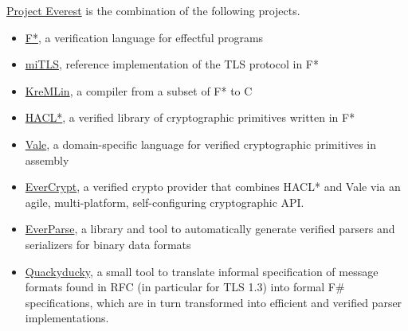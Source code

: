 \documentclass[12pt,twoside]{article}
\begin{document}
\noindent{}\href{https://project-everest.github.io}{Project Everest} is the combination of the following projects.%

\begin{itemize}[noitemsep,topsep=\mdcompacttopsep]%

\item{}\href{https://fstar-lang.org}{F*}, a verification language for effectful programs%

\item{}\href{https://mitls.org/}{miTLS}, reference implementation of the TLS protocol in F*%

\item{}\href{https://github.com/FStarLang/kremlin}{KreMLin}, a compiler from a subset of F* to C%

\item{}\href{https://github.com/mitls/hacl-star}{HACL*}, a verified library of cryptographic primitives written in F*%

\item{}\href{https://github.com/project-everest/vale}{Vale}, a domain-specific language for verified cryptographic primitives in assembly%

\item{}\href{https://github.com/project-everest/hacl-star/blob/fstar-master/README.EverCrypt.md}{EverCrypt}, a verified crypto provider that combines HACL* and Vale via an agile, multi-platform, self-configuring cryptographic API.%

\item{}\href{https://github.com/project-everest/everparse}{EverParse}, a library and tool to automatically generate verified parsers and serializers for binary data formats%

\item{}\href{https://github.com/project-everest/quackyducky}{Quackyducky}, a small tool to translate informal specification of
message formats found in RFC (in particular for TLS 1.3) into formal
F\# specifications, which are in turn transformed into efficient and
verified parser implementations.%
\end{itemize}%
\end{document}
